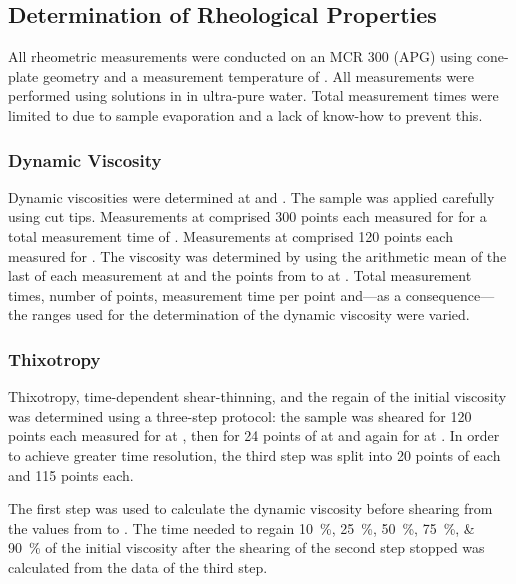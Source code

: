 \subsection{Determination of Rheological Properties}
All rheometric measurements were conducted on an MCR 300 (APG) using cone-plate geometry and a measurement temperature of . All measurements were performed using  \eps{} solutions in   in ultra-pure water. Total measurement times were limited to  due to sample evaporation and a lack of know-how to prevent this.

\subsubsection{Dynamic Viscosity}
Dynamic viscosities were determined at  and . The sample was applied carefully using cut  tips. Measurements at  comprised 300 points each measured for  for a total measurement time of . Measurements at  comprised 120 points each measured for . The viscosity was determined by using the arithmetic mean of the last  of each measurement at  and the points from  to  at . Total measurement times, number of points, measurement time per point and---as a consequence---the ranges used for the determination of the dynamic viscosity were varied.

\subsubsection{Thixotropy}
Thixotropy, time-dependent shear-thinning, and the regain of the initial viscosity was determined using a three-step protocol: the sample was sheared for 120 points each measured for  at , then for 24 points of  at  and again for  at . In order to achieve greater time resolution, the third step was split into 20 points of  each and 115 points  each.

The first step was used to calculate the dynamic viscosity before shearing from the values from  to . The time needed to regain \SIlist{10; 25; 50; 75; 90}{\percent} of the initial viscosity after the shearing of the second step stopped was calculated from the data of the third step.

